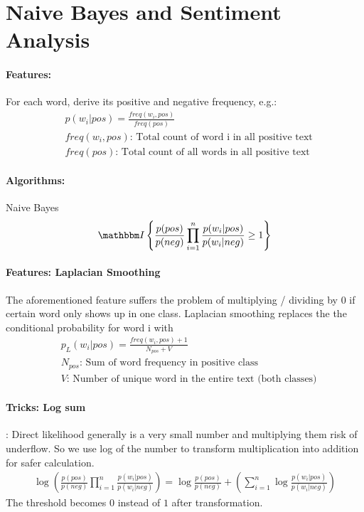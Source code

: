 \section{Naive Bayes and Sentiment Analysis} 
\paragraph{Features:} For each word, derive its positive and negative frequency, e.g.: 
    \begin{align*}
        & p(w_i|pos) = \frac{freq(w_i, pos)}{freq(pos)}\\
        & freq(w_i, pos) \text{: Total count of word i in all positive text}\\
        & freq(pos) \text{: Total count of all words in all positive text}
    \end{align*}

\paragraph{Algorithms:} Naive Bayes 
    \begin{equation*}
        \indic{\frac{p(pos)}{p(neg)}\prod_{i=1}^n \frac{p(w_i|pos)}{p(w_i|neg)} \geq 1} 
    \end{equation*}


\paragraph{Features: Laplacian Smoothing} The aforementioned feature suffers the problem of multiplying / dividing by 0 if certain word only shows up in one class. Laplacian smoothing replaces the the conditional probability for word i with 
    \begin{align*}
        & p_{L}(w_i|pos) = \frac{freq(w_i, pos) + 1}{N_{pos} + V}\\
        & N_{pos} \text{: Sum of word frequency in positive class} \\
        & V \text{: Number of unique word in the entire text (both classes)} 
    \end{align*}

\paragraph{Tricks: Log sum}: Direct likelihood generally is a very small number and multiplying them risk of underflow. So we use log of the number to transform multiplication into addition for safer calculation. 
    \begin{align*}
        \log\left( \frac{p(pos)}{p(neg)}\prod_{i=1}^n \frac{p(w_i|pos)}{p(w_i|neg)} \right) = \log \frac{p(pos)}{p(neg)} + \left( \sum_{i=1}^n \log \frac{p(w_i|pos)}{p(w_i|neg)} \right)
    \end{align*}
The threshold becomes $0$ instead of $1$ after transformation. 




